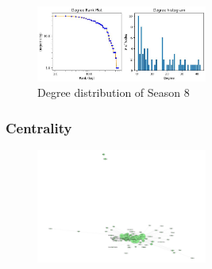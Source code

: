 \documentclass[10pt,twocolumn,letterpaper]{article}
\begin{document}
\begin{figure}[!h]
    \centering
    \includegraphics[width=0.5\textwidth]{img/s8/degree_plot.jpg}
    \caption{\small{Degree distribution of Season 8}}
\end{figure}

\newpage

\subsubsection{Centrality}

\begin{figure}[!h]
    \centering
    \includegraphics[width=0.5\textwidth]{img/s8/pagerank_graph.jpg}
\end{figure}
\end{document}
